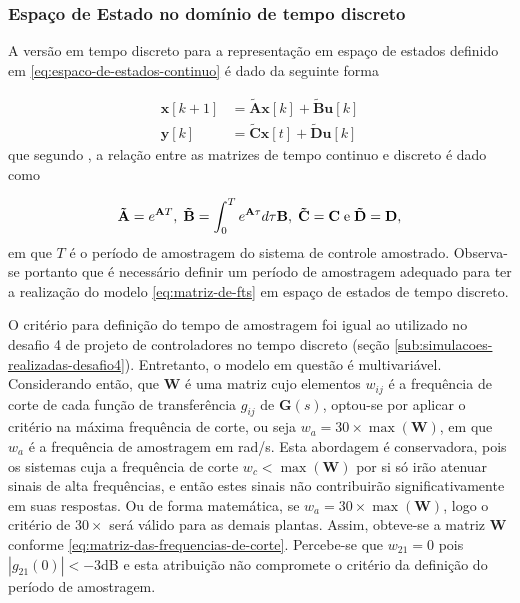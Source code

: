 \subsubsection{Espaço de Estado no domínio de tempo discreto}
\label{subsub:espaco-de-estados-no-dominio-de-tempo-discreto}

A versão em tempo discreto para a representação em espaço de estados definido em
\ref{eq:espaco-de-estados-continuo} é dado da seguinte forma

\begin{subequations}
    \label{eq:espaco-de-estados-discreto}
    \begin{align}
        \mathbf{x}[k+1] & = \mathbf{\tilde{A}}\mathbf{x}[k] + \mathbf{\tilde{B}}\mathbf{u}[k]
        \label{eq:estimativa-do-vetor-de-estados}                                             \\
        \mathbf{y}[k]   & = \mathbf{\tilde{C}}\mathbf{x}[t] + \mathbf{\tilde{D}}\mathbf{u}[k]
        \label{eq:saida-do-sistema-em-espaco-de-estados-discreto}
    \end{align}
\end{subequations} que segundo \cite{Chen2006}, a relação entre as
matrizes de tempo continuo e discreto é dado como

\begin{equation*}
    \mathbf{\tilde{A}} = e^{\mathbf{A}T},
    \thickspace
    \mathbf{\tilde{B}} = \int_{0}^{T}e^{\mathbf{A}\tau}d\tau \mathbf{B},
    \thickspace
    \mathbf{\tilde{C}} = \mathbf{C}
    \thickspace \text{e} \thickspace
    \mathbf{\tilde{D}} = \mathbf{D},
\end{equation*} em que $T$ é o período de amostragem do sistema de controle
amostrado. Observa-se portanto que é necessário definir um período de amostragem
adequado para ter a realização do modelo \ref{eq:matriz-de-fts} em espaço de
estados de tempo discreto.

O critério para definição do tempo de amostragem foi igual ao utilizado no
desafio 4 de projeto de controladores no tempo discreto (seção
\ref{sub:simulacoes-realizadas-desafio4}). Entretanto, o modelo em questão é
multivariável. Considerando então, que $\mathbf{W}$ é uma matriz cujo elementos
$w_{ij}$ é a frequência de corte de cada função de transferência $g_{ij}$ de
$\mathbf{G}(s)$, optou-se por aplicar o critério na máxima frequência de corte,
ou seja $w_a = 30\times\max(\mathbf{W})$, em que $w_a$ é a frequência de
amostragem em rad/s. Esta abordagem é conservadora, pois os sistemas cuja a
frequência de corte $w_c < \max(\mathbf{W})$ por si só irão atenuar sinais de
alta frequências, e então estes sinais não contribuirão significativamente em
suas respostas. Ou de forma matemática, se $w_a = 30\times\max(\mathbf{W})$,
logo o critério de $30\times$ será válido para as demais plantas. Assim,
obteve-se a matriz $\mathbf{W}$ conforme
\ref{eq:matriz-das-frequencias-de-corte}. Percebe-se que $w_{21} = 0$ pois
$|g_{21}(0)| < -3$dB e esta atribuição não compromete o critério da
definição do período de amostragem.

